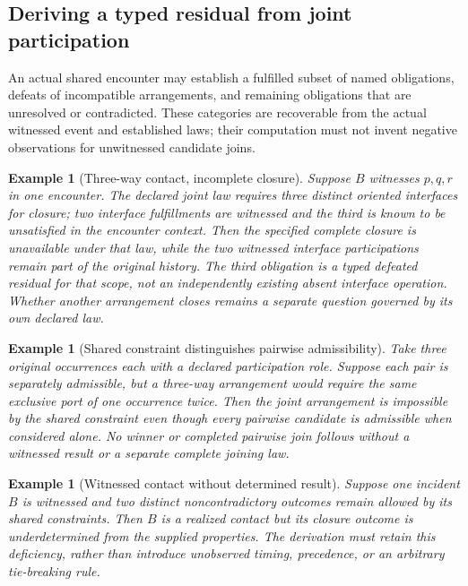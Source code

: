 \documentclass[11pt]{article}
\newtheorem{example}[definition]{Example}
\begin{document}
\subsection{Deriving a typed residual from joint participation}
An actual shared encounter may establish a fulfilled subset
of named obligations, defeats of incompatible arrangements,
and remaining obligations that are unresolved or
contradicted. These categories are recoverable from the
actual witnessed event and established laws; their
computation must not invent negative observations for
unwitnessed candidate joins.

\begin{example}[Three-way contact, incomplete closure]
Suppose $B$ witnesses $p,q,r$ in one encounter. The declared
joint law requires three distinct oriented interfaces for
closure; two interface fulfillments are witnessed and the
third is known to be unsatisfied in the encounter context.
Then the \emph{specified} complete closure is unavailable
under that law, while the two witnessed interface
participations remain part of the original history.
The third obligation is a typed defeated residual for that
scope, not an independently existing absent interface
operation. Whether another arrangement closes remains
a separate question governed by its own declared law.
\end{example}

\begin{example}[Shared constraint distinguishes pairwise admissibility]
Take three original occurrences each with a declared
participation role. Suppose each pair is separately
admissible, but a three-way arrangement would require
the same exclusive port of one occurrence twice.
Then the joint arrangement is impossible by the shared
constraint even though every pairwise candidate is
admissible when considered alone. No winner or completed
pairwise join follows without a witnessed result or a
separate complete joining law.
\end{example}

\begin{example}[Witnessed contact without determined result]
Suppose one incident $B$ is witnessed and two distinct
noncontradictory outcomes remain allowed by its shared
constraints. Then $B$ is a realized contact but its
closure outcome is underdetermined from the supplied
properties. The derivation must retain this deficiency,
rather than introduce unobserved timing, precedence,
or an arbitrary tie-breaking rule.
\end{example}
\end{document}
